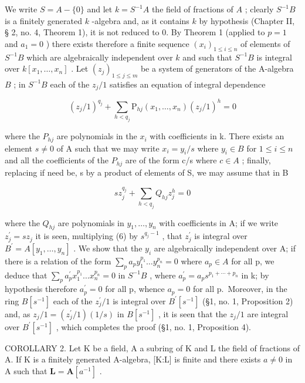 We write \(S = A - \{0\}\) and let \(k = S^{-1}A\) the field of fractions of \(A\) ; clearly \(S^{-1}B\) is a finitely generated \(k\) -algebra and, as it contains \(k\) by hypothesis (Chapter II, § 2, no. 4, Theorem 1), it is not reduced to 0. By Theorem 1 (applied to \(p = 1\) and \(a_1 = 0\) ) there exists therefore a finite sequence \((x_i)_{1 \leqslant i \leqslant n}\) of elements of \(S^{-1}B\) which are algebraically independent over \(k\) and such that \(S^{-1}B\) is integral over \(k[x_1, \ldots, x_n]\) . Let \((z_j)_{1 \leqslant j \leqslant m}\) be a system of generators of the A-algebra \(B\) ; in \(S^{-1}B\) each of the \(z_j/1\) satisfies an equation of integral dependence

\[
(z _ {j} / 1) ^ {q _ {j}} + \sum_ {h <   q _ {j}} \mathrm{P} _ {h j} (x _ {1}, \dots , x _ {n}) (z _ {j} / 1) ^ {h} = 0\tag{5}
\]

where the \(P_{hj}\) are polynomials in the \(x_{i}\) with coefficients in k. There exists an element \(s \neq 0\) of A such that we may write \(x_{i} = y_{i}/s\) where \(y_{i} \in B\) for \(1 \leqslant i \leqslant n\) and all the coefficients of the \(P_{hj}\) are of the form c/s where \(c \in A\) ; finally, replacing if need be, s by a product of elements of S, we may assume that in B

\[
s z _ {j} ^ {q _ {j}} + \sum_ {h <   q _ {j}} Q _ {h j} z _ {j} ^ {h} = 0\tag{6}
\]

where the \(Q_{hj}\) are polynomials in \(y_{1},\ldots,y_{n}\) with coefficients in A; if we write \(z_{j}^{\prime}=sz_{j}\) it is seen, multiplying (6) by \(s^{q_{j}-1}\) , that \(z_{j}^{\prime}\) is integral over \(B^{\prime}=A[y_{1},\ldots,y_{n}]\) . We show that the \(y_{i}\) are algebraically independent over A; if there is a relation of the form \(\sum_{p}a_{p}y_{1}^{p_{1}}\ldots y_{n}^{p_{n}}=0\) where \(a_{p}\in A\) for all p, we deduce that \(\sum_{p}a_{p}^{\prime}x_{1}^{p_{1}}\ldots x_{n}^{p_{n}}=0\) in \(S^{-1}B\) , where \(a_{p}^{\prime}=a_{p}s^{p_{1}+\cdots+p_{n}}\) in k; by hypothesis therefore \(a_{p}^{\prime}=0\) for all p, whence \(a_{p}=0\) for all p.~Moreover, in the ring \(B[s^{-1}]\) each of the \(z_{j}^{\prime}/1\) is integral over \(B^{\prime}[s^{-1}]\) (§1, no. 1, Proposition 2) and, as \(z_{j}/1=(z_{j}^{\prime}/1)(1/s)\) in \(B[s^{-1}]\) , it is seen that the \(z_{j}/1\) are integral over \(B^{\prime}[s^{-1}]\) , which completes the proof (§1, no. 1, Proposition 4).

COROLLARY 2. Let K be a field, A a subring of K and L the field of fractions of A. If K is a finitely generated A-algebra, {[}K:L{]} is finite and there exists \(a \neq 0\) in A such that \(\mathbf{L} = \mathbf{A}[a^{-1}]\) .

